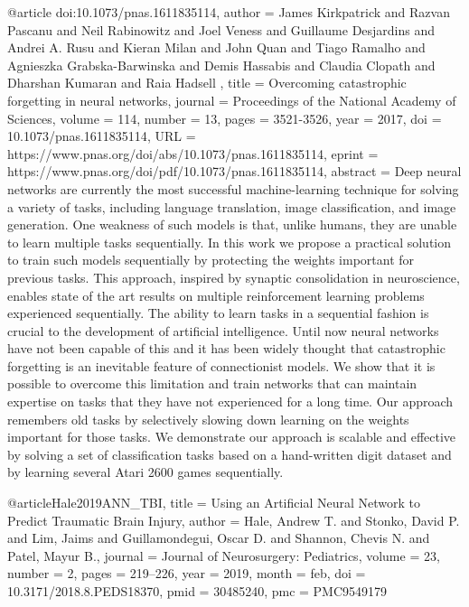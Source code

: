 \begin{bib}

@article{
doi:10.1073/pnas.1611835114,
author = {James Kirkpatrick  and Razvan Pascanu  and Neil Rabinowitz  and Joel Veness  and Guillaume Desjardins  and Andrei A. Rusu  and Kieran Milan  and John Quan  and Tiago Ramalho  and Agnieszka Grabska-Barwinska  and Demis Hassabis  and Claudia Clopath  and Dharshan Kumaran  and Raia Hadsell },
title = {Overcoming catastrophic forgetting in neural networks},
journal = {Proceedings of the National Academy of Sciences},
volume = {114},
number = {13},
pages = {3521-3526},
year = {2017},
doi = {10.1073/pnas.1611835114},
URL = {https://www.pnas.org/doi/abs/10.1073/pnas.1611835114},
eprint = {https://www.pnas.org/doi/pdf/10.1073/pnas.1611835114},
abstract = {Deep neural networks are currently the most successful machine-learning technique for solving a variety of tasks, including language translation, image classification, and image generation. One weakness of such models is that, unlike humans, they are unable to learn multiple tasks sequentially. In this work we propose a practical solution to train such models sequentially by protecting the weights important for previous tasks. This approach, inspired by synaptic consolidation in neuroscience, enables state of the art results on multiple reinforcement learning problems experienced sequentially. The ability to learn tasks in a sequential fashion is crucial to the development of artificial intelligence. Until now neural networks have not been capable of this and it has been widely thought that catastrophic forgetting is an inevitable feature of connectionist models. We show that it is possible to overcome this limitation and train networks that can maintain expertise on tasks that they have not experienced for a long time. Our approach remembers old tasks by selectively slowing down learning on the weights important for those tasks. We demonstrate our approach is scalable and effective by solving a set of classification tasks based on a hand-written digit dataset and by learning several Atari 2600 games sequentially.}}

@article{Hale2019ANN_TBI,
  title   = {Using an Artificial Neural Network to Predict Traumatic Brain Injury},
  author  = {Hale, Andrew T. and
             Stonko, David P. and
             Lim, Jaims and
             Guillamondegui, Oscar D. and
             Shannon, Chevis N. and
             Patel, Mayur B.},
  journal = {Journal of Neurosurgery: Pediatrics},
  volume  = {23},
  number  = {2},
  pages   = {219--226},
  year    = {2019},
  month   = feb,
  doi     = {10.3171/2018.8.PEDS18370},
  pmid    = {30485240},
  pmc     = {PMC9549179}
}


\end{bib}